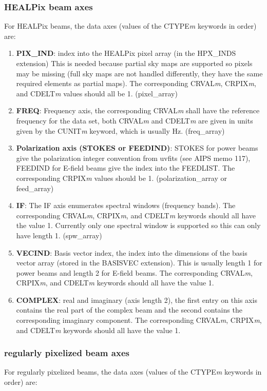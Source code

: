 \documentclass[11pt, oneside]{article}   	%
\begin{document}
\subsubsection{HEALPix beam axes}
For HEALPix beams, the data axes (values of the CTYPE\textit{m} keywords in order) are: 
\begin{enumerate}
\item{\textbf{PIX\_IND}: index into the HEALPix pixel array (in the HPX\_INDS extension) This is needed because partial sky maps are supported so pixels may be missing (full sky maps are not handled differently, they have the same required elements as partial maps). The corresponding CRVAL\textit{m}, CRPIX\textit{m}, and CDELT\textit{m} values should all be 1. (pixel\_array)}
\item{\textbf{FREQ}: Frequency axis, the corresponding CRVAL\textit{m} shall have the reference frequency for the data set, both CRVAL\textit{m} and CDELT\textit{m} are given in units given by the CUNIT\textit{m} keyword, which is usually Hz. (freq\_array)}
\item{\textbf{Polarization axis (STOKES or FEEDIND)}: STOKES for power beams give the polarization integer convention from uvfits (see AIPS memo 117), FEEDIND for E-field beams give the index into the FEEDLIST. The corresponding CRPIX\textit{m} values should be 1. (polarization\_array or feed\_array)}
\item{\textbf{IF}: The IF axis enumerates spectral windows (frequency bands). The corresponding CRVAL\textit{m}, CRPIX\textit{m}, and CDELT\textit{m} keywords should all have the value 1. Currently only one spectral window is supported so this can only have length 1. (spw\_array)}
\item{\textbf{VECIND}: Basis vector index, the index into the dimensions of the basis vector array (stored in the BASISVEC extension). This is usually length 1 for power beams and length 2 for E-field beams. The corresponding CRVAL\textit{m}, CRPIX\textit{m}, and CDELT\textit{m} keywords should all have the value 1.}
\item{\textbf{COMPLEX}: real and imaginary (axis length 2), the first entry on this axis contains the real part of the complex beam and the second contains the corresponding imaginary component. The corresponding CRVAL\textit{m}, CRPIX\textit{m}, and CDELT\textit{m} keywords should all have the value 1.}
\end{enumerate}

\subsubsection{regularly pixelized beam axes}
For regularly pixelized beams, the data axes (values of the CTYPE\textit{m} keywords in order) are: 
\end{document}

